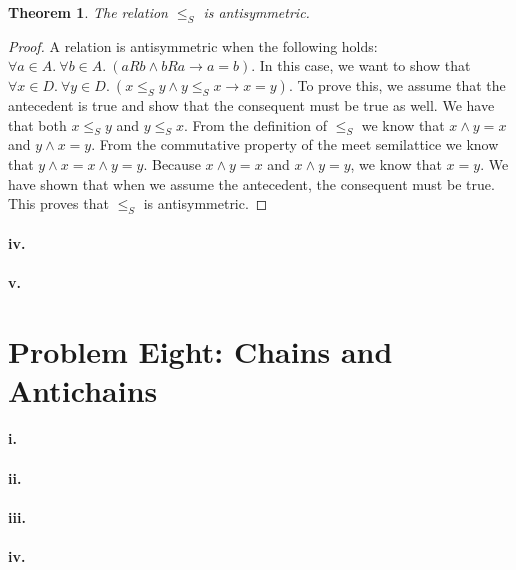 \documentclass[10pt,letter]{article}
\newtheorem*{thm}{Theorem}
\begin{document}
\begin{thm} The relation $\le_S$ is antisymmetric. \end{thm}
\begin{proof} A relation is antisymmetric when the following holds: $\forall a \in A .\ \forall b \in A .\ (aRb \wedge bRa \rightarrow a = b)$. In this case, we want to show that $\forall x \in D .\ \forall y \in D .\ (x \le_S y \wedge y \le_S x \rightarrow x = y)$. To prove this, we assume that the antecedent is true and show that the consequent must be true as well. We have that both $x \le_S y$ and $y \le_S x$. From the definition of $\le_S$ we know that $x \wedge y = x$ and $y \wedge x = y$. From the commutative property of the meet semilattice we know that $y \wedge x = x \wedge y = y$. Because $x \wedge y = x$ and $x \wedge y = y$, we know that $x = y$. We have shown that when we assume the antecedent, the consequent must be true. This proves that $\le_S$ is antisymmetric.
\end{proof}

\paragraph{iv.}
\paragraph{v.}

\section*{Problem Eight: Chains and Antichains}

\paragraph{i.}
\paragraph{ii.}
\paragraph{iii.}
\paragraph{iv.}

\end{document}
